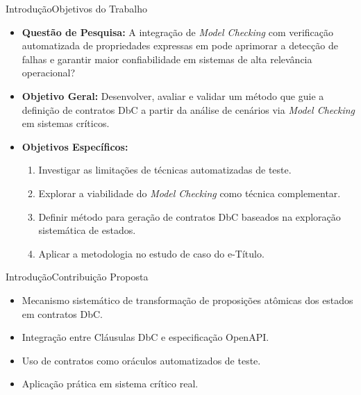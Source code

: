 \documentclass[10pt]{beamer}
\begin{document}
\begin{frame}{Introdução}{Objetivos do Trabalho}
  \begin{itemize}
    \item \textbf{Questão de Pesquisa:} A integração de \textit{Model Checking} com verificação automatizada de propriedades expressas em \textbf{} pode aprimorar a detecção de falhas e garantir maior confiabilidade em sistemas de alta relevância operacional?
    \item \textbf{Objetivo Geral:} Desenvolver, avaliar e validar um método que guie a definição de contratos DbC a partir da análise de cenários via \textit{Model Checking} em sistemas críticos.
    \item \textbf{Objetivos Específicos:}
    \begin{enumerate}
        \item Investigar as limitações de técnicas automatizadas de teste.
        \item Explorar a viabilidade do \textit{Model Checking} como técnica complementar.
        \item Definir método para geração de contratos DbC baseados na exploração sistemática de estados.
        \item Aplicar a metodologia no estudo de caso do e-Título.
    \end{enumerate}
  \end{itemize}
\end{frame}

\begin{frame}{Introdução}{Contribuição Proposta}
  \begin{itemize}
    \item Mecanismo sistemático de transformação de proposições atômicas dos estados em contratos DbC.
    \item Integração entre Cláusulas DbC e especificação OpenAPI.
    \item Uso de contratos como oráculos automatizados de teste.
    \item Aplicação prática em sistema crítico real.
  \end{itemize}
\end{frame}
\end{document}
